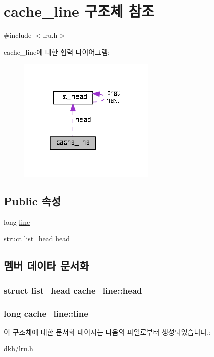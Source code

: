 \hypertarget{structcache__line}{\section{cache\+\_\+line 구조체 참조}
\label{structcache__line}
}


{\ttfamily \#include $<$lru.\+h$>$}



cache\+\_\+line에 대한 협력 다이어그램\+:\nopagebreak
\begin{figure}[H]
\begin{center}
\leavevmode
\includegraphics[width=187pt]{structcache__line__coll__graph}
\end{center}
\end{figure}
\subsection*{Public 속성}
\begin{DoxyCompactItemize}
\item 
long \hyperlink{structcache__line_a22870a00436e7425597606393d81eb2c}{line}
\item 
struct \hyperlink{structlist__head}{list\+\_\+head} \hyperlink{structcache__line_af231d538713478b74fc7811adc00545b}{head}
\end{DoxyCompactItemize}


\subsection{멤버 데이타 문서화}
\hypertarget{structcache__line_af231d538713478b74fc7811adc00545b}{
\subsubsection[{head}]{\setlength{\rightskip}{0pt plus 5cm}struct {\bf list\+\_\+head} cache\+\_\+line\+::head}}\label{structcache__line_af231d538713478b74fc7811adc00545b}
\hypertarget{structcache__line_a22870a00436e7425597606393d81eb2c}{
\subsubsection[{line}]{\setlength{\rightskip}{0pt plus 5cm}long cache\+\_\+line\+::line}}\label{structcache__line_a22870a00436e7425597606393d81eb2c}


이 구조체에 대한 문서화 페이지는 다음의 파일로부터 생성되었습니다.\+:\begin{DoxyCompactItemize}
\item 
dkh/\hyperlink{lru_8h}{lru.\+h}\end{DoxyCompactItemize}
